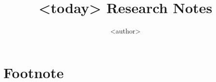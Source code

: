 

\author{<author>}
\title{<today> Research Notes}

\maketitle








\newpage
\section{Footnote}


